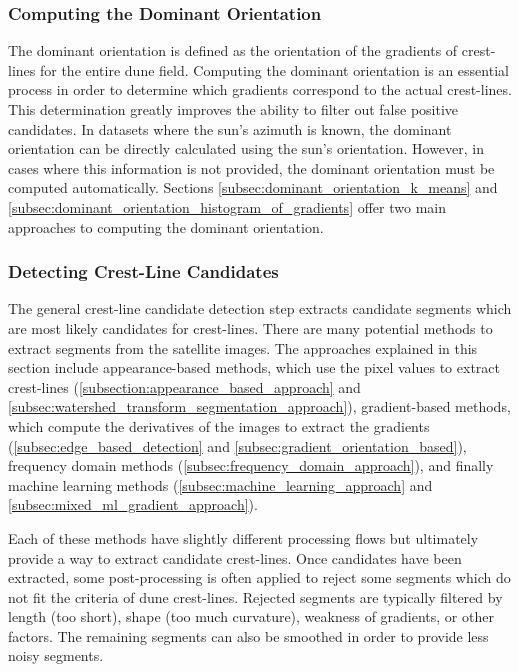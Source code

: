 \subsubsection*{Computing the Dominant Orientation} 
The dominant orientation is defined as the orientation of the gradients of crest-lines for the entire dune field. Computing the dominant orientation is an essential process in order to determine which gradients correspond to the actual crest-lines. This determination greatly improves the ability to filter out false positive candidates. In datasets where the sun's azimuth is known, the dominant orientation can be directly calculated using the sun's orientation. However, in cases where this information is not provided, the dominant orientation must be computed automatically. Sections \ref{subsec:dominant_orientation_k_means} and \ref{subsec:dominant_orientation_histogram_of_gradients} offer two main approaches to computing the dominant orientation.

\subsubsection*{Detecting Crest-Line Candidates}
The general crest-line candidate detection step extracts candidate segments which are most likely candidates for crest-lines. There are many potential methods to extract segments from the satellite images. The approaches explained in this section include appearance-based methods, which use the pixel values to extract crest-lines (\ref{subsection:appearance_based_approach} and \ref{subsec:watershed_transform_segmentation_approach}), gradient-based methods, which compute the derivatives of the images to extract the gradients (\ref{subsec:edge_based_detection} and \ref{subsec:gradient_orientation_based}), frequency domain methods (\ref{subsec:frequency_domain_approach}), and finally machine learning methods (\ref{subsec:machine_learning_approach} and \ref{subsec:mixed_ml_gradient_approach}). 

Each of these methods have slightly different processing flows but ultimately provide a way to extract candidate crest-lines. Once candidates have been extracted, some post-processing is often applied to reject some segments which do not fit the criteria of dune crest-lines. Rejected segments are typically filtered by length (too short), shape (too much curvature), weakness of gradients, or other factors. The remaining segments can also be smoothed in order to provide less noisy segments.

